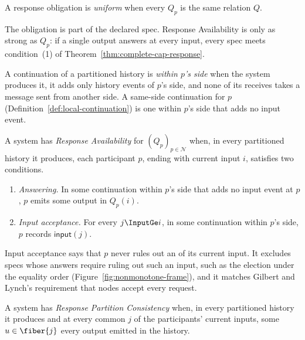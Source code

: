 \begin{definition}
\label{def:uniform-obligation}
A response obligation is \emph{uniform} when every $Q_p$ is the same
relation $Q$.
\end{definition}

The obligation is part of the declared spec.  Response Availability is only
as strong as $Q_p$: if a single output answers at every input, every spec
meets condition~(1) of Theorem~\ref{thm:complete-cap-response}.

A continuation of a partitioned history is \emph{within $p$'s side} when
the system produces it, it adds only history events of $p$'s side, and none of its
receives takes a message sent from another side.  A same-side continuation
for $p$ (Definition~\ref{def:local-continuation}) is one within $p$'s side
that adds no input event.

\begin{definition}
\label{def:response-availability}
A system has \emph{Response Availability} for $(Q_p)_{p\in\mathcal N}$ when, in every
partitioned history it produces, each participant $p$, ending with current
input $i$, satisfies two conditions.
\begin{enumerate}
  \item \emph{Answering.}  In some continuation within $p$'s side that
        adds no input event at $p$, $p$ emits some output in $Q_p(i)$.
  \item \emph{Input acceptance.}  For every $j\InputGe i$, in some
        continuation within $p$'s side, $p$ records $\mathsf{input}(j)$.
\end{enumerate}
\end{definition}

Input acceptance says that $p$ never rules out an \indesc of its current
input.  It excludes specs whose answers require ruling out such an input, such
as the election under the equality order (Figure~\ref{fig:nonmonotone-frame}),
and it matches Gilbert and Lynch's requirement that nodes accept every
request.

\begin{definition}
\label{def:response-partition-consistency}
A system has \emph{Response Partition Consistency} when, in every partitioned
history it produces and at every common \indesc $j$ of the participants'
current inputs, some $u\in\fiber{j}$ \outrel every output emitted in the
history.
\end{definition}

